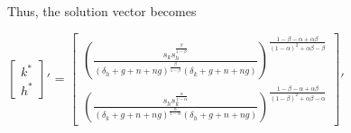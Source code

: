 \documentclass{article}
\begin{document}
Thus, the solution vector becomes
\begin{center}
 $ \begin{bmatrix}
  k^* \\ h^*
 \end{bmatrix}'$ 
 =
  $ \begin{bmatrix}
  \left(\frac{s_k s_h^{\frac{ \beta}{1-\beta}}}{\left(\delta_h +g+n+ng\right)^{\frac{\beta}{1-\beta}}\left(\delta_k +g+n+ng\right)}\right)^{\frac{1-\beta- \alpha + \alpha \beta}{\left(1-\alpha\right)^2 +\alpha \beta -\beta}}  \\ \left(\frac{s_h s_k^{\frac{\alpha}{1-\alpha}}}{\left(\delta_k +g+n+ng\right)^{\frac{\alpha}{1-\alpha}}\left(\delta_h +g+n+ng\right)}\right)^{\frac{1-\beta- \alpha + \alpha \beta}{\left(1-\beta \right)^2 +\alpha \beta -\alpha}}
 \end{bmatrix}'$ 
 \end{center}
\end{document}

